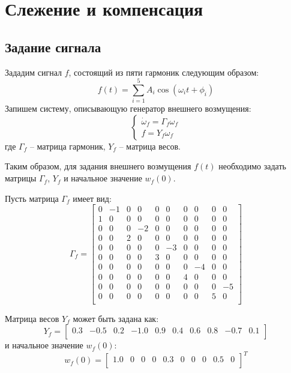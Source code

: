 \section{Слежение и компенсация}
\subsection{Задание сигнала}
Зададим сигнал $f$, состоящий из пяти гармоник следующим образом:
\begin{equation}
    f(t) = \sum_{i=1}^{5} A_i \cos(\omega_i t + \phi_i)
\end{equation}
Запишем систему, описывающую генератор внешнего возмущения: 
\begin{equation}
    \begin{cases}
        \dot{\omega}_f = \Gamma_f \omega_f \\
        f = Y_f \omega_f
    \end{cases}
\end{equation}
где $\Gamma_f$ -- матрица гармоник, $Y_f$ -- матрица весов. 

Таким образом, для задания внешнего возмущения $f(t)$ необходимо задать матрицы 
$\Gamma_f$, $Y_f$ и начальное значение $w_f(0)$. 

Пусть матрица $\Gamma_f$ имеет вид:
\begin{equation}
    \Gamma_f = \begin{bmatrix}
        0 & -1 & 0 & 0 & 0 & 0 & 0 & 0 & 0 & 0 \\
        1 & 0 & 0 & 0 & 0 & 0 & 0 & 0 & 0 & 0 \\
        0 & 0 & 0 & -2 & 0 & 0 & 0 & 0 & 0 & 0 \\
        0 & 0 & 2 & 0 & 0 & 0 & 0 & 0 & 0 & 0 \\
        0 & 0 & 0 & 0 & 0 & -3 & 0 & 0 & 0 & 0 \\
        0 & 0 & 0 & 0 & 3 & 0 & 0 & 0 & 0 & 0 \\
        0 & 0 & 0 & 0 & 0 & 0 & 0 & -4 & 0 & 0 \\
        0 & 0 & 0 & 0 & 0 & 0 & 4 & 0 & 0 & 0 \\
        0 & 0 & 0 & 0 & 0 & 0 & 0 & 0 & 0 & -5 \\
        0 & 0 & 0 & 0 & 0 & 0 & 0 & 0 & 5 & 0 \\
    \end{bmatrix}
\end{equation}

Матрица весов $Y_f$ может быть задана как:
\begin{equation}
    Y_f = \begin{bmatrix}
        0.3 & -0.5 & 0.2 & -1.0 & 0.9 & 0.4 & 0.6 & 0.8 & -0.7 & 0.1 \\
    \end{bmatrix}
\end{equation}
и начальное значение $w_f(0)$:
\begin{equation}
    w_f(0) = \begin{bmatrix}
        1.0 & 0 & 0 & 0 & 0.3 & 0 & 0 & 0 & 0.5 & 0 \\
    \end{bmatrix}^T
\end{equation}

